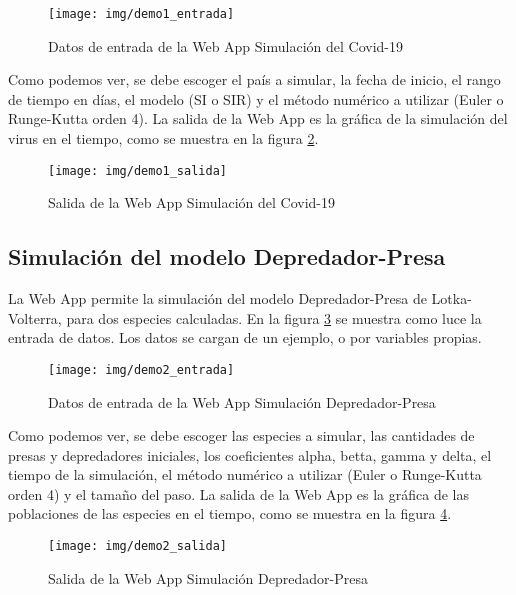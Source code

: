 \documentclass[a4paper,12pt]{article}
\begin{document}
\begin{figure}[ht!]
\centering
\texttt{[image: img/demo1\_entrada]}
\vspace{-1em}
\caption{Datos de entrada de la Web App Simulación del Covid-19}
\label{fig:demo1_entrada}
\end{figure} \par

Como podemos ver, se debe escoger el país a simular, la fecha de inicio, el rango de tiempo en días, el modelo (SI o SIR) y el método numérico a utilizar (Euler o Runge-Kutta orden 4). La salida de la Web App es la gráfica de la simulación del virus en el tiempo, como se muestra en la figura \ref{fig:demo1_salida}.

\begin{figure}[ht!]
\centering
\texttt{[image: img/demo1\_salida]}
\vspace{-1em}
\caption{Salida de la Web App Simulación del Covid-19}
\label{fig:demo1_salida}
\end{figure} \par

\subsection{Simulación del modelo Depredador-Presa}

La Web App permite la simulación del modelo Depredador-Presa de Lotka-Volterra, para dos especies calculadas. En la figura \ref{fig:demo2_entrada} se muestra como luce la entrada de datos. Los datos se cargan de un ejemplo, o por variables propias.

\begin{figure}[ht!]
\centering
\texttt{[image: img/demo2\_entrada]}
\vspace{-1em}
\caption{Datos de entrada de la Web App Simulación Depredador-Presa}
\label{fig:demo2_entrada}
\end{figure} \par

Como podemos ver, se debe escoger las especies a simular, las cantidades de presas y depredadores iniciales, los coeficientes alpha, betta, gamma y delta, el tiempo de la simulación, el método numérico a utilizar (Euler o Runge-Kutta orden 4) y el tamaño del paso. La salida de la Web App es la gráfica de las poblaciones de las especies en el tiempo, como se muestra en la figura \ref{fig:demo2_salida}.

\begin{figure}[ht!]
\centering
\texttt{[image: img/demo2\_salida]}
\vspace{-1em}
\caption{Salida de la Web App Simulación Depredador-Presa}
\label{fig:demo2_salida}
\end{figure} \par
\end{document}
